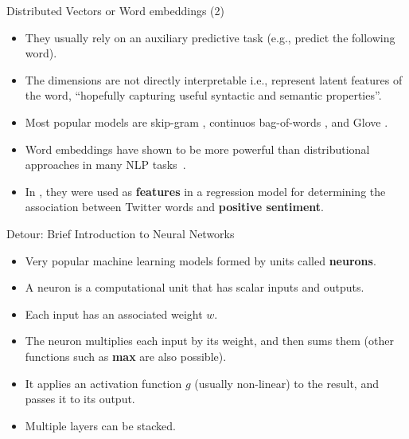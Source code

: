 \begin{frame}{Distributed Vectors or Word embeddings (2)}
\begin{scriptsize}
\begin{itemize}


\item They usually rely on an auxiliary predictive task (e.g., predict the following word).

\item The dimensions are not directly interpretable i.e., represent latent features of  the  word,  ``hopefully capturing useful syntactic and semantic properties''\cite{turian2010word}.

\item Most popular models are skip-gram \cite{Mikolov2013}, continuos bag-of-words \cite{Mikolov2013}, and Glove \cite{penningtonSM14}.

\item Word embeddings have shown to be more powerful than distributional approaches in many NLP tasks~\cite{baroni2014don}.

\item In \cite{amir2015SemEval}, they were used as \textbf{features} in a regression model for determining the association between Twitter words and \textbf{positive sentiment}. 

\end{itemize}
\end{scriptsize}
\end{frame}




\begin{frame}{Detour: Brief Introduction to Neural Networks}
\begin{scriptsize}
\begin{itemize}
\item Very popular machine learning models formed by units called \textbf{neurons}.
\item A neuron is a computational unit that has scalar inputs and outputs. 
\item  Each input has an associated weight $w$.
 \item The neuron multiplies each input by its weight, and then sums them (other functions such as \textbf{max} are also possible). 
\item It applies an activation function $g$ (usually non-linear) to the result, and passes it to its output.
\item Multiple layers can be stacked.
\end{itemize}


\end{scriptsize}
\end{frame}


